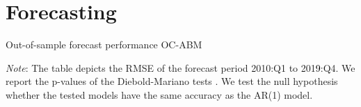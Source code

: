 \documentclass[9pt]{beamer}
\begin{document}
\section{Forecasting}
\begin{frame}{Out-of-sample forecast performance OC-ABM}
    \begin{table}[!h]
	\caption{Out-of-sample forecast performance} 
	\label{table:rmse_ABM}
	\centering
	\begin{tablenotes}
		\footnotesize \item \textit{Note}: The table depicts the RMSE of the forecast period 2010:Q1 to 201\textcolor{black}{9}:Q4. We report the p-values of the Diebold-Mariano tests \citep{harveyTestingEqualityPrediction1997}.  We test the null hypothesis whether the tested models have the same accuracy as the AR(1) model.
	\end{tablenotes}
\end{table}
\end{frame}
\end{document}
